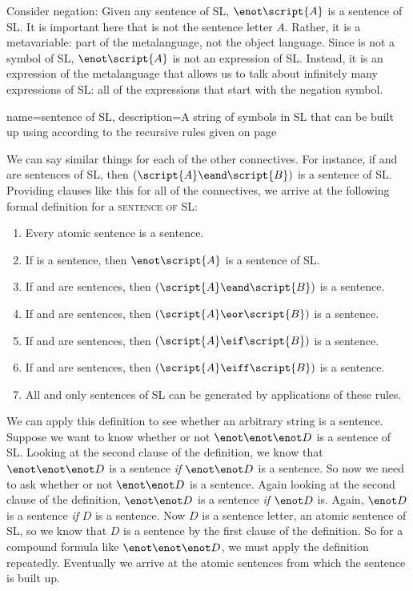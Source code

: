 Consider negation: Given any sentence  of SL, $\enot\script{A}$ is a sentence of SL. It is important here that  is not the sentence letter $A$. Rather, it is a metavariable: part of the metalanguage, not the object language. Since  is not a symbol of SL, $\enot\script{A}$ is not an expression of SL. Instead, it is an expression of the metalanguage that allows us to talk about infinitely many expressions of SL: all of the expressions that start with the negation symbol. 


{
name=sentence of SL,
description={A string of symbols in SL that can be built up using according to the recursive rules given on page }
}



We can say similar things for each of the other connectives. For instance, if  and  are sentences of SL, then $(\script{A}\eand\script{B})$ is a sentence of SL. Providing clauses like this for all of the connectives, we arrive at the following formal definition for a \textsc{\gls{sentence of SL}}: \label{def:sentence_of_SL}

\begin{enumerate}
\item Every atomic sentence is a sentence.
\item If  is a sentence, then $\enot\script{A}$ is a sentence of SL.
\item If  and  are sentences, then $(\script{A}\eand\script{B})$ is a sentence.
\item If  and  are sentences, then $(\script{A}\eor\script{B})$ is a sentence.
\item If  and  are sentences, then $(\script{A}\eif\script{B})$ is a sentence.
\item If  and  are sentences, then $(\script{A}\eiff\script{B})$ is a sentence.
\item All and only sentences of SL can be generated by applications of these rules.
\end{enumerate}

We can apply this definition to see whether an arbitrary string is a sentence. Suppose we want to know whether or not $\enot \enot \enot D$ is a sentence of SL. Looking at the second clause of the definition, we know that $\enot \enot \enot D$ is a sentence \emph{if} $\enot \enot D$ is a sentence. So now we need to ask whether or not $\enot \enot D$ is a sentence. Again looking at the second clause of the definition, $\enot \enot D$ is a sentence \emph{if} $\enot D$ is. Again, $\enot D$ is a sentence \emph{if} $D$ is a sentence. Now $D$ is a sentence letter, an atomic sentence of SL, so we know that $D$ is a sentence by the first clause of the definition. So for a compound formula like $\enot \enot \enot D$, we must apply the definition repeatedly. Eventually we arrive at the atomic sentences from which the sentence is built up.

